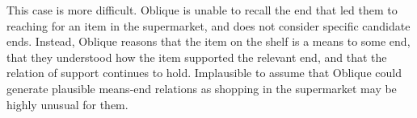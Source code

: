 \documentclass[10pt]{article}
\begin{document}
This case is more difficult.
Oblique is unable to recall the end that led them to reaching for an item in the supermarket, and does not consider specific candidate ends.
Instead, Oblique reasons that the item on the shelf is a means to some end, that they understood how the item supported the relevant end, and that the relation of support continues to hold.
Implausible to assume that Oblique could generate plausible means-end relations as shopping in the supermarket may be highly unusual for them.


\end{document}
